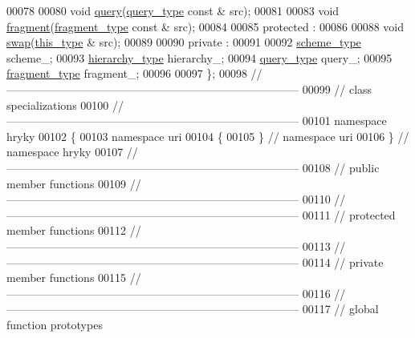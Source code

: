 \begin{DoxyCode}
00078 
00080     \textcolor{keywordtype}{void} \hyperlink{classhryky_1_1uri_1_1_entity_a033e68dfdc2bb4475e49ccd9e3acf557}{query}(\hyperlink{classhryky_1_1uri_1_1query_1_1_entity}{query_type} \textcolor{keyword}{const} & src);
00081 
00083     \textcolor{keywordtype}{void} \hyperlink{classhryky_1_1uri_1_1_entity_aa182043428f00f90fc524a4e18d0fe8d}{fragment}(\hyperlink{classhryky_1_1uri_1_1fragment_1_1_entity}{fragment_type} \textcolor{keyword}{const} & src);
00084 
00085 \textcolor{keyword}{protected} :
00086 
00088     \textcolor{keywordtype}{void} \hyperlink{classhryky_1_1uri_1_1_entity_a2257d6deca01c7b246e6353c469be048}{swap}(\hyperlink{classhryky_1_1uri_1_1_entity}{this_type} & src);
00089 
00090 \textcolor{keyword}{private} :
00091 
00092     \hyperlink{classhryky_1_1uri_1_1scheme_1_1_entity}{scheme_type}         scheme\_;
00093     \hyperlink{classhryky_1_1uri_1_1hierarchy_1_1_entity}{hierarchy_type}      hierarchy\_;
00094     \hyperlink{classhryky_1_1uri_1_1query_1_1_entity}{query_type}          query\_;
00095     \hyperlink{classhryky_1_1uri_1_1fragment_1_1_entity}{fragment_type}       fragment\_;
00096 
00097 \};
00098 \textcolor{comment}{//
      ------------------------------------------------------------------------------}
00099 \textcolor{comment}{// class specializations}
00100 \textcolor{comment}{//
      ------------------------------------------------------------------------------}
00101 \textcolor{keyword}{namespace }hryky
00102 \{
00103 \textcolor{keyword}{namespace }uri
00104 \{
00105 \} \textcolor{comment}{// namespace uri}
00106 \} \textcolor{comment}{// namespace hryky}
00107 \textcolor{comment}{//
      ------------------------------------------------------------------------------}
00108 \textcolor{comment}{// public member functions}
00109 \textcolor{comment}{//
      ------------------------------------------------------------------------------}
00110 \textcolor{comment}{//
      ------------------------------------------------------------------------------}
00111 \textcolor{comment}{// protected member functions}
00112 \textcolor{comment}{//
      ------------------------------------------------------------------------------}
00113 \textcolor{comment}{//
      ------------------------------------------------------------------------------}
00114 \textcolor{comment}{// private member functions}
00115 \textcolor{comment}{//
      ------------------------------------------------------------------------------}
00116 \textcolor{comment}{//
      ------------------------------------------------------------------------------}
00117 \textcolor{comment}{// global function prototypes}

\end{DoxyCode}

